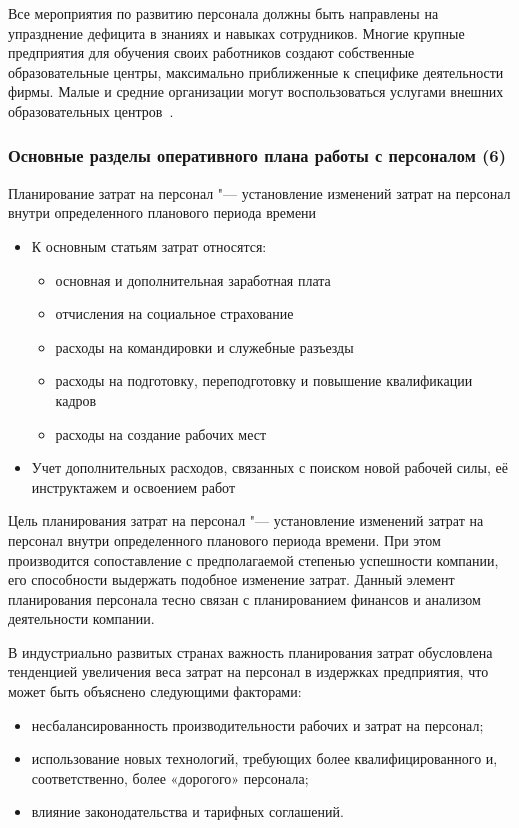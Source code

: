 \documentclass{../industrial-development}
\begin{document}
	Все мероприятия по развитию персонала должны быть направлены на упразднение дефицита в знаниях и навыках сотрудников. Многие крупные предприятия для обучения своих работников создают собственные образовательные центры, максимально приближенные к специфике деятельности фирмы. Малые и средние организации могут воспользоваться услугами внешних образовательных центров~\cite{Durakova}.
	
	\begin{frame} \frametitle{Основные разделы оперативного плана работы с персоналом (6)}
		\alert{Планирование затрат на персонал} "--- установление изменений затрат на персонал внутри определенного планового периода времени
		\begin{itemize}
			\item К основным статьям затрат относятся: 
			\begin{itemize}
				\item основная и дополнительная заработная плата
				\item отчисления на социальное страхование
				\item расходы на командировки и служебные разъезды
				\item расходы на подготовку, переподготовку и повышение квалификации кадров
				\item расходы на создание рабочих мест
			\end{itemize}
			\item Учет дополнительных расходов, связанных с поиском новой рабочей силы, её инструктажем и освоением работ
		\end{itemize}
	\end{frame}
	
	\lecturenotes
	
	\alert{Цель планирования затрат на персонал} "--- установление изменений затрат на персонал внутри определенного планового периода времени. При этом производится сопоставление с предполагаемой степенью успешности компании, его способности выдержать подобное изменение затрат. Данный элемент планирования персонала тесно связан с планированием финансов и анализом деятельности компании.
	
	В индустриально развитых странах важность планирования затрат обусловлена тенденцией увеличения веса затрат на персонал в издержках предприятия, что может быть объяснено следующими факторами:
	\begin{itemize}
		\item несбалансированность производительности рабочих и затрат на персонал;
		\item использование новых технологий, требующих более квалифицированного и, соответственно, более «дорогого» персонала;
		\item влияние законодательства и тарифных соглашений.
	\end{itemize}
	
\end{document}
